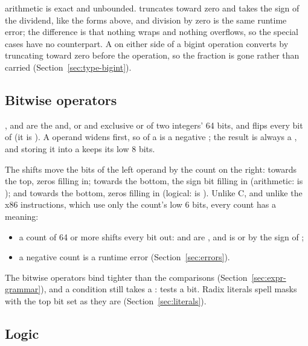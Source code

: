  arithmetic is exact and unbounded. \ic{/} truncates toward zero
and \ic{\%} takes the sign of the dividend, like the  forms above,
and division by zero is the same runtime error; the difference is that nothing
wraps and nothing overflows, so the  special cases have no
counterpart. A  on either side of a bigint operation converts by
truncating toward zero before the operation, so the fraction is gone rather
than carried (Section~\ref{sec:type-bigint}).

\subsection{Bitwise operators}
\label{sec:bitwise}

\ic{\&}, \ic{|} and \ic{\textasciicircum{}} are the and, or and exclusive
or of two integers' 64 bits, and  flips every bit
of  (it is ). A  operand widens first, so
 of a  is a negative ; the
result is always a , and storing it into a  keeps its
low 8 bits.

The shifts move the bits of the left operand by the count on the right:
 towards the top, zeros filling in;  towards
the bottom, the sign bit filling in (arithmetic:  is
); and  towards the bottom, zeros filling in
(logical:  is ). Unlike C, and unlike the x86
instructions, which use only the count's low 6 bits, every count has a
meaning:

\begin{itemize}[nosep]
\item a count of 64 or more shifts every bit out:  and
   are , and  is  or 
  by the sign of ;
\item a negative count is a runtime error (Section~\ref{sec:errors}).
\end{itemize}

\noindent The bitwise operators bind tighter than the comparisons
(Section~\ref{sec:expr-grammar}), and a condition still takes a
:  tests a bit. Radix literals spell
masks with the top bit set as they are (Section~\ref{sec:literals}).

\subsection{Logic}
\label{sec:logic}

